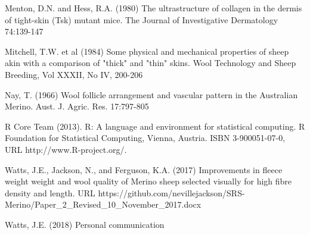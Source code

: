 \documentclass[titlepage]{article}  %
\begin{document}
\begin{thebibliography}{99}
Menton, D.N. and Hess, R.A. (1980) The ultrastructure of collagen in the dermis of tight-skin (Tsk) mutant mice. The Journal of Investigative Dermatology 74:139-147

Mitchell, T.W. et al (1984) Some physical and mechanical properties of sheep akin with a comparison of "thick" and "thin" skins. Wool Technology and Sheep Breeding, Vol XXXII, No IV, 200-206


Nay, T. (1966) Wool follicle arrangement and vascular pattern in the Australian Merino. Aust. J. Agric. Res. 17:797-805

R Core Team (2013). R: A language and environment for statistical
  computing. R Foundation for Statistical Computing, Vienna, Austria.
  ISBN 3-900051-07-0, URL http://www.R-project.org/.


Watts, J.E., Jackson, N., and Ferguson, K.A. (2017) Improvements in fleece weight weight and wool quality of Merino sheep selected visually for high fibre density and length. URL https://github.com/nevillejackson/SRS-Merino/Paper\_2\_Revised\_10\_November\_2017.docx 

Watts, J.E. (2018) Personal communication

\end{thebibliography}
\end{document}
